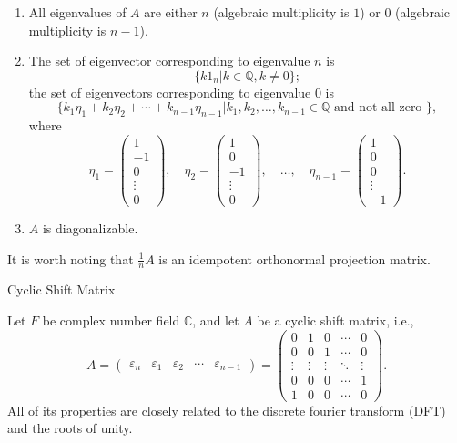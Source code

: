 \documentclass[11pt]{../../TexTemplate/elegantbook} %
\begin{document}
\begin{enumerate}
    \item All eigenvalues of \(A\) are either \(n\) (algebraic multiplicity is \(1\)) or \(0\) (algebraic multiplicity is \(n-1\)).
    \item The set of eigenvector corresponding to eigenvalue \(n\) is 
        \[
        \{ k 1_{n} | k \in \mathbb{Q}, k \neq 0 \};
        \]
        the set of eigenvectors corresponding to eigenvalue \(0\) is 
        \[
        \{ k_{1}\eta_{1}+ k_{2}\eta_{2} + \cdots + k_{n-1}\eta_{n-1} | k_{1}, k_{2}, \ldots, k_{n-1} \in \mathbb{Q} 
        \text{ and not all zero } \},
        \]
        where 
        \[
        \eta_{1} = \begin{pmatrix}
            1 \\
            -1 \\
            0 \\
            \vdots \\
            0
        \end{pmatrix}, \quad
        \eta_{2} = \begin{pmatrix}
            1 \\
            0 \\
            -1 \\
            \vdots \\
            0
        \end{pmatrix}, \quad
        \ldots, \quad
        \eta_{n-1} = \begin{pmatrix}
            1 \\
            0 \\
            0 \\
            \vdots \\
            -1
        \end{pmatrix}.
        \]
    \item \(A\) is diagonalizable.
\end{enumerate}

It is worth noting that \(\frac{1}{n}A\) is an idempotent orthonormal projection matrix.


\begin{leftbarTitle}{Cyclic Shift Matrix}\end{leftbarTitle}
Let \(F\) be complex number field \( \mathbb{C} \), and let \(A\) be a cyclic shift matrix, i.e.,
\[
A = \begin{pmatrix} 
    \varepsilon_{n} & \varepsilon_{1} & \varepsilon_{2} & \cdots & \varepsilon_{n-1}
\end{pmatrix} 
= \begin{pmatrix}
    0 & 1 & 0 & \cdots & 0 \\
    0 & 0 & 1 & \cdots & 0 \\
    \vdots & \vdots & \vdots & \ddots & \vdots \\
    0 & 0 & 0 & \cdots & 1 \\
    1 & 0 & 0 & \cdots & 0
\end{pmatrix}.
\]
All of its properties are closely related to the discrete fourier transform (DFT) and the roots of unity.
\end{document}
